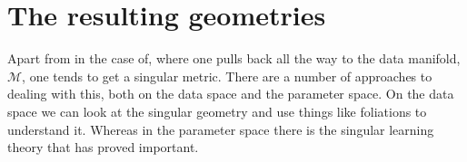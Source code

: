 \documentclass{tufte-handout}
\begin{document}
\section{The resulting geometries}

Apart from in the case of\cite{Cayco_Gajic2026}, where one pulls back all the way to the data manifold, $\mathcal{M}$, one tends to get a singular metric. There are a number of approaches to dealing with this, both on the data space and the parameter space. On the data space we can look at the singular geometry\cite{Benfenati2024} and use things like foliations\cite{Tron2024} to understand it. Whereas in the parameter space there is the singular learning theory that has proved important.



\end{document}
